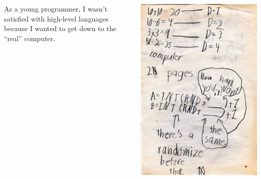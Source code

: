 \documentclass[aspectratio=169]{beamer}
\begin{document}
\begin{frame}{}
\vspace{1.25 cm}
\Large
\begin{columns}
\begin{center}
As a young programmer, I wasn't satisfied with high-level languages because I wanted to get down to the ``real'' computer.

\vspace{0.75 cm}

\vspace{0.75 cm}
\end{center}
\includegraphics[width=\linewidth]{jimbasic1.jpg}
\end{columns}
\end{frame}
\end{document}

